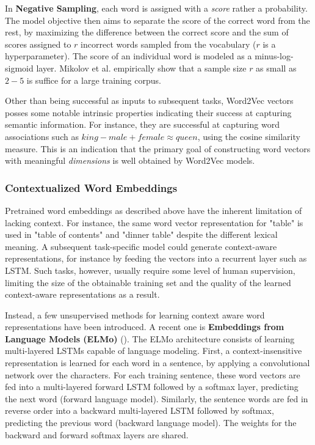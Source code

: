 In \textbf{Negative Sampling}, each word is assigned with a \emph{score} rather a probability. The model objective then aims to separate the score of the correct word from the rest, by maximizing the difference between the correct score and the sum of scores assigned to $r$ incorrect words sampled from the vocabulary ($r$ is a hyperparameter). The score of an individual word is modeled as a minus-log-sigmoid layer. Mikolov et al. empirically show that a sample size $r$ as small as $2 - 5$ is suffice for a large training corpus. 

Other than being successful as inputs to subsequent tasks, Word2Vec vectors posses some notable intrinsic properties indicating their success at capturing semantic information. For instance, they are successful at capturing word associations such as $king - male + female \approx queen$, using the cosine similarity measure. This is an indication that the primary goal of constructing word vectors with meaningful \emph{dimensions} is well obtained by Word2Vec models.

\subsubsection{Contextualized Word Embeddings}
Pretrained word embeddings as described above have the inherent limitation of lacking context. For instance, the same word vector representation for "table" is used in "table of contents" and "dinner table" despite the different lexical meaning. A subsequent task-specific model could generate context-aware representations, for instance by feeding the vectors into a recurrent layer such as LSTM. Such tasks, however, usually require some level of human supervision, limiting the size of the obtainable training set and the quality of the learned context-aware representations as a result. 

Instead, a few unsupervised methods for learning context aware word representations have been introduced. A recent one is \textbf{Embeddings from Language Models (ELMo)} (\cite{elmo}). The ELMo architecture consists of learning multi-layered LSTMs capable of language modeling. First, a context-insensitive representation is learned for each word in a sentence, by applying a convolutional network over the characters. For each training sentence, these word vectors are fed into a multi-layered forward LSTM followed by a softmax layer, predicting the next word (forward language model). Similarly, the sentence words are fed in reverse order into a backward multi-layered LSTM followed by softmax, predicting the previous word (backward language model). The weights for the backward and forward softmax layers are shared. 

